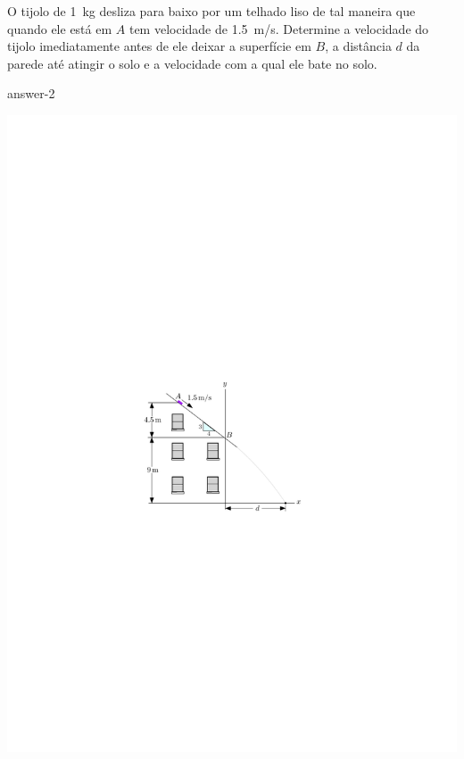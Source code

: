 
\item O tijolo de \SI{1}{\kilogram} desliza para baixo por um telhado liso de tal maneira que quando ele está em $A$ tem velocidade de \SI{1.5}{\meter/\second}. Determine a velocidade do tijolo imediatamente antes de ele deixar a superfície em $B$, a distância $d$ da parede até atingir o solo e a velocidade com a qual ele bate no solo.

{answer-2}

\vspace{-2.65cm}
\begin{flushright}
    \includegraphics[scale=1.3]{images/draw_2.pdf}
\end{flushright}
